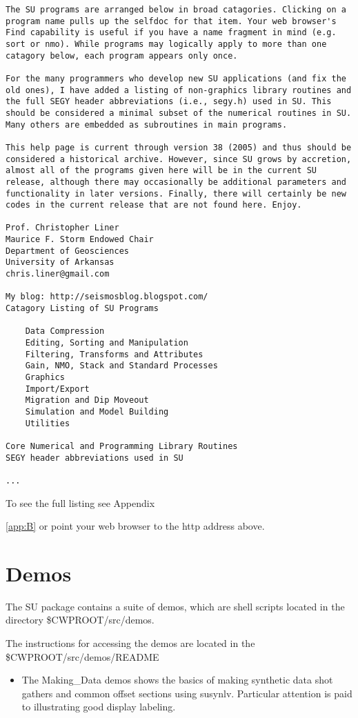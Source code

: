 {{{\begin{verbatim}
The SU programs are arranged below in broad catagories. Clicking on a program name pulls up the selfdoc for that item. Your web browser's Find capability is useful if you have a name fragment in mind (e.g. sort or nmo). While programs may logically apply to more than one catagory below, each program appears only once.

For the many programmers who develop new SU applications (and fix the old ones), I have added a listing of non-graphics library routines and the full SEGY header abbreviations (i.e., segy.h) used in SU. This should be considered a minimal subset of the numerical routines in SU. Many others are embedded as subroutines in main programs.

This help page is current through version 38 (2005) and thus should be considered a historical archive. However, since SU grows by accretion, almost all of the programs given here will be in the current SU release, although there may occasionally be additional parameters and functionality in later versions. Finally, there will certainly be new codes in the current release that are not found here. Enjoy.

Prof. Christopher Liner
Maurice F. Storm Endowed Chair
Department of Geosciences
University of Arkansas
chris.liner@gmail.com

My blog: http://seismosblog.blogspot.com/
Catagory Listing of SU Programs

    Data Compression
    Editing, Sorting and Manipulation
    Filtering, Transforms and Attributes
    Gain, NMO, Stack and Standard Processes
    Graphics
    Import/Export
    Migration and Dip Moveout
    Simulation and Model Building
    Utilities

Core Numerical and Programming Library Routines
SEGY header abbreviations used in SU

...
\end{verbatim}}\noindent
To see the full listing see Appendix~{\ref{app:B} or point your
web browser to the http address above.


\section{Demos}
The SU package contains a suite of demos, which are shell scripts
located in the directory \$CWPROOT/src/demos.

The instructions for accessing the demos are located in the
\$CWPROOT/src/demos/README 

\begin{itemize}
\item The Making\_Data demos shows the basics of making synthetic data
shot gathers and common offset sections using susynlv.  Particular
attention is paid to illustrating good display labeling.


\end{itemize}}}}
